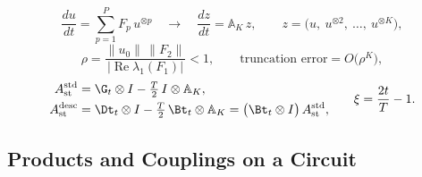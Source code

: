 \begin{equation}
    \frac{du}{dt} = \sum_{p=1}^{P} F_p\,u^{\otimes p}
    \quad\longrightarrow\quad
    \frac{dz}{dt} = \mathbb{A}_K\,z,
    \qquad
    z = \bigl(u,\ u^{\otimes 2},\ \dots,\ u^{\otimes K}\bigr),
    \label{eq:carleman-lift}
\end{equation}
\begin{equation}
    \rho = \frac{\|u_0\|\,\|F_2\|}{\bigl|\operatorname{Re}\lambda_1(F_1)\bigr|} < 1,
    \qquad
    \text{truncation error} = O\bigl(\rho^{K}\bigr),
    \label{eq:carleman-ratio}
\end{equation}
\begin{equation}
    \begin{aligned}
        A_{\mathrm{st}}^{\mathrm{std}} &= \G_t \otimes I - \tfrac{T}{2}\, I \otimes \mathbb{A}_K, \\
        A_{\mathrm{st}}^{\mathrm{desc}} &= \Dt_t \otimes I - \tfrac{T}{2}\, \Bt_t \otimes \mathbb{A}_K
        = \bigl(\Bt_t \otimes I\bigr)\, A_{\mathrm{st}}^{\mathrm{std}},
    \end{aligned}
    \qquad
    \xi = \frac{2t}{T} - 1 .
    \label{eq:carleman-spacetime}
\end{equation}

\subsection{Products and Couplings on a Circuit}
\label{sec:folds}


